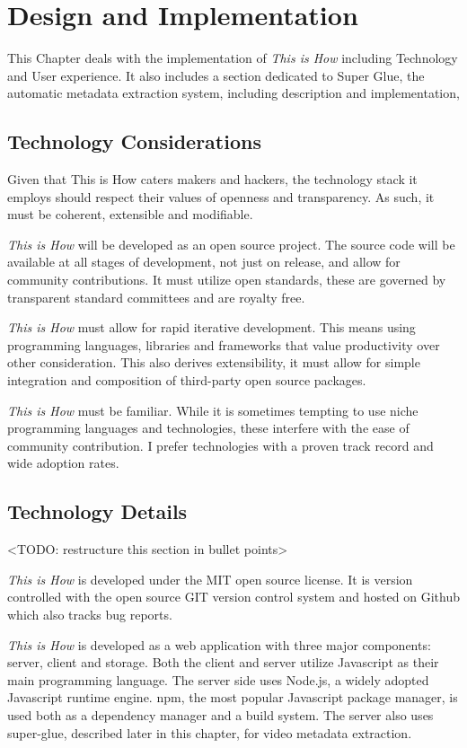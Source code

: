 \chapter{Design and Implementation}
\label{chap_design}

This Chapter deals with the implementation of \textit{This is How} including Technology and User experience. It also includes a section dedicated to Super Glue, the automatic metadata extraction system, including description and implementation, 

\section{Technology Considerations}

Given that This is How caters makers and hackers, the technology stack it employs should respect their values of openness and transparency. As such, it must be coherent, extensible and modifiable.
 
\textit{This is How} will be developed as an open source project. The source code will be available at all stages of development, not just on release, and allow for community contributions. It must utilize open standards, these are governed by transparent standard committees and are royalty free. 

\textit{This is How} must allow for rapid iterative development. This means using programming languages, libraries and frameworks that value productivity over other consideration. This also derives extensibility, it must allow for simple integration and composition of third-party open source packages. 

\textit{This is How} must be familiar. While it is sometimes tempting to use niche programming languages and technologies, these interfere with the ease of community contribution. I prefer technologies with a proven track record and wide adoption rates.

\section{Technology Details}

<TODO: restructure this section in bullet points>

\textit{This is How} is developed under the MIT open source license. It is version controlled with the open source GIT\cite{git} version control system and hosted on Github\cite{github} which also tracks bug reports. 

\textit{This is How} is developed as a web application with three major components: server, client and storage. Both the client and server utilize Javascript as their main programming language. The server side uses Node.js, a widely adopted Javascript runtime engine. npm\cite{npm}, the most popular Javascript package manager, is used both as a dependency manager and a build system. The server also uses super-glue, described later in this chapter, for video metadata extraction.

